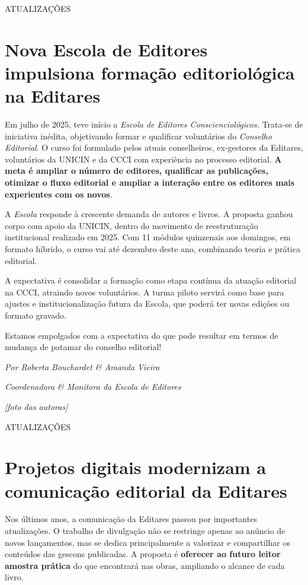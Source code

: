 \documentclass[
]{article}
\begin{document}
ATUALIZAÇÕES

\section{Nova Escola de Editores impulsiona formação editoriológica na Editares}\label{nova-escola-de-editores-impulsiona-formauxe7uxe3o-editorioluxf3gica-na-editares}

Em julho de 2025, teve início a \emph{Escola de Editores Conscienciológicos.} Trata-se de iniciativa inédita, objetivando formar e qualificar voluntários do \emph{Conselho Editorial}. O curso foi formulado pelos atuais conselheiros, ex-gestores da Editares, voluntários da UNICIN e da CCCI com experiência no processo editorial. \textbf{A meta é ampliar o número de editores, qualificar as publicações, otimizar o fluxo editorial e ampliar a interação entre os editores mais experientes com os novos}.

A \emph{Escola} responde à crescente demanda de autores e livros. A proposta ganhou corpo com apoio da UNICIN, dentro do movimento de reestruturação institucional realizado em 2025. Com 11 módulos quinzenais aos domingos, em formato híbrido, o curso vai até dezembro deste ano, combinando teoria e prática editorial.

A expectativa é consolidar a formação como etapa contínua da atuação editorial na CCCI, atraindo novos voluntários. A turma piloto servirá como base para ajustes e institucionalização futura da Escola, que poderá ter novas edições ou formato gravado.

Estamos empolgados com a expectativa do que pode resultar em termos de mudança de patamar do conselho editorial!

\emph{Por Roberta Bouchardet \& Amanda Vieira}

\emph{Coordenadora \& Monitora da Escola de Editores}

\emph{{[}foto das autoras{]}}

ATUALIZAÇÕES

\section{Projetos digitais modernizam a comunicação editorial da Editares}\label{projetos-digitais-modernizam-a-comunicauxe7uxe3o-editorial-da-editares}

Nos últimos anos, a comunicação da Editares passou por importantes atualizações. O trabalho de divulgação não se restringe apenas ao anúncio de novos lançamentos, mas se dedica principalmente a valorizar e compartilhar os conteúdos das gescons publicadas. A proposta é \textbf{oferecer ao futuro leitor amostra prática} do que encontrará nas obras, ampliando o alcance de cada livro.
\end{document}
